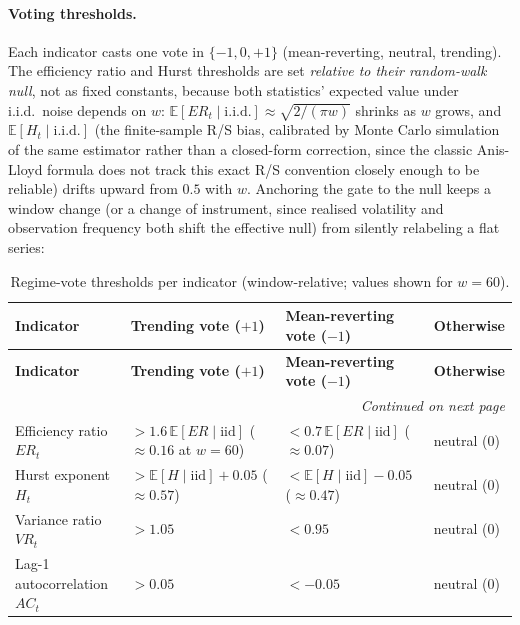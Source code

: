 \paragraph{Voting thresholds.} Each indicator casts one vote in $\{-1, 0, +1\}$
(mean-reverting, neutral, trending). The efficiency ratio and Hurst thresholds are set
\emph{relative to their random-walk null}, not as fixed constants, because both
statistics' expected value under i.i.d.\ noise depends on $w$:
$\mathbb{E}[ER_t \mid \text{i.i.d.}] \approx \sqrt{2/(\pi w)}$ shrinks as $w$ grows, and
$\mathbb{E}[H_t \mid \text{i.i.d.}]$ (the finite-sample R/S bias, calibrated by Monte
Carlo simulation of the same estimator rather than a closed-form correction, since the
classic Anis-Lloyd formula does not track this exact R/S convention closely enough to
be reliable) drifts upward from $0.5$ with $w$. Anchoring the gate to the null keeps a
window change (or a change of instrument, since realised volatility and observation
frequency both shift the effective null) from silently relabeling a flat series:

{\small
\setlength{\LTleft}{0pt}
\setlength{\LTright}{0pt}
\setlength{\tabcolsep}{5pt}
\renewcommand{\arraystretch}{1.15}
\begin{longtable}{p{} p{} p{} p{}}
\caption{Regime-vote thresholds per indicator (window-relative; values shown for $w=60$).}\label{tab:pairs-regime-votes-overleaf} \\
\toprule
\textbf{Indicator} & \textbf{Trending vote ($+1$)} & \textbf{Mean-reverting vote ($-1$)} & \textbf{Otherwise} \\
\midrule
\endfirsthead
\toprule
\textbf{Indicator} & \textbf{Trending vote ($+1$)} & \textbf{Mean-reverting vote ($-1$)} & \textbf{Otherwise} \\
\midrule
\endhead
\midrule
\multicolumn{4}{r}{\textit{Continued on next page}} \\
\midrule
\endfoot
\bottomrule
\endlastfoot
Efficiency ratio $ER_t$ & $> 1.6\,\mathbb{E}[ER\mid\mathrm{iid}]$ ($\approx 0.16$ at $w{=}60$) & $< 0.7\,\mathbb{E}[ER\mid\mathrm{iid}]$ ($\approx 0.07$) & neutral ($0$) \\
Hurst exponent $H_t$ & $> \mathbb{E}[H\mid\mathrm{iid}] + 0.05$ ($\approx 0.57$) & $< \mathbb{E}[H\mid\mathrm{iid}] - 0.05$ ($\approx 0.47$) & neutral ($0$) \\
Variance ratio $VR_t$ & $> 1.05$ & $< 0.95$ & neutral ($0$) \\
Lag-1 autocorrelation $AC_t$ & $> 0.05$ & $< -0.05$ & neutral ($0$) \\
\end{longtable}
}

